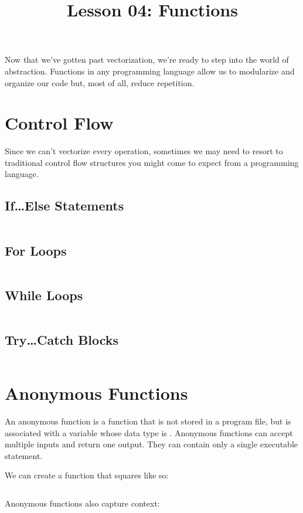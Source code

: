 \documentclass{article}
\title{Lesson 04: Functions}
\begin{document}
\renderTitle

Now that we've gotten past vectorization, we're ready to step into the
world of abstraction.  Functions in any programming language allow us to
modularize and organize our code but, most of all, reduce repetition.

\section{Control Flow}

Since we can't vectorize every operation, sometimes we may need to
resort to traditional control flow structures you might come to expect
from a programming language.

\subsection{If\dots Else Statements}

\inputminted{matlab}{04-functions.d/if-else.m}

\subsection{For Loops}

\inputminted{matlab}{04-functions.d/for.m}

\subsection{While Loops}

\inputminted{matlab}{04-functions.d/while.m}

\subsection{Try\dots Catch Blocks}

\inputminted{matlab}{04-functions.d/try-catch.m}

\section{Anonymous Functions}

An anonymous function is a function that is not stored in a program
file, but is associated with a variable whose data type is .  Anonymous functions can accept multiple inputs and
return one output. They can contain only a single executable statement.%

We can create a function that squares like so:

\inputminted{matlab}{04-functions.d/sq.m}

Anonymous functions also capture context:

\end{document}
